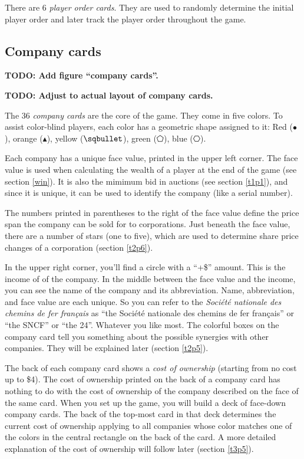 \documentclass[10pt,final]{report}
\begin{document}
\begin{multicols}{2}
There are 6 \emph{player order cards}. They are used to randomly
determine the initial player order and later track the player order
throughout the game.

\subsection{Company cards}

\textbf{TODO: Add figure ``company cards''.}

\textbf{TODO: Adjust to actual layout of company cards.}

The 36 \emph{company cards} are the core of the game. They come in five
colors. To assist color-blind players, each color has a geometric
shape assigned to it: Red ($\bullet$), orange ($\blacktriangleup$),
yellow ($\sqbullet$), green ($\pentagon$), blue ($\hexagon$).

Each company has a unique face value, printed in the upper left
corner. The face value is used when calculating the wealth
of a player at the end of the game (see section \ref{win}). It is also
the mimimum bid in auctions (see section \ref{t1p1}), and since it is
unique, it can be used to identify the company (like a serial number).

The numbers printed in parentheses to the right of the face value
define the price span the company can be sold for to
corporations. Just beneath the face value, there are a number of stars
(one to five), which are used to determine share price changes of a
corporation (section \ref{t2p6}).

In the upper right corner, you'll find a circle with a
``+\$'' amount. This is the income of of the company. In the middle
between the face value and the income, you can see the name of the
company and its abbreviation. Name, abbreviation, and face value are
each unique. So you can refer to the \emph{Société nationale des
  chemins de fer français} as ``the Société nationale des chemins de
fer français'' or ``the SNCF'' or ``the 24''. Whatever you like
most. The colorful boxes on the company card tell you something about
the possible synergies with other companies. They will be explained
later (section \ref{t2p5}).

The back of each company card shows a \emph{cost of ownership}
(starting from no cost up to \$4). The cost of ownership
printed on the back of a company card has nothing to do with the cost
of ownership of the company described on the face of the same
card. When you set up the game, you will build a deck of face-down
company cards. The back of the top-most card in that deck determines
the current cost of ownership applying to all companies whose color
matches one of the colors in the central rectangle on the back of the
card. A more detailed explanation of the cost of ownership will follow
later (section \ref{t3p5}).


\end{multicols}
\end{document}
